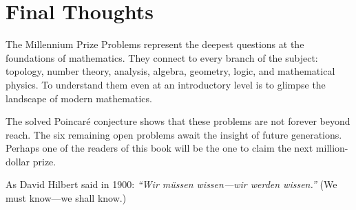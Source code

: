 \documentclass[11pt,a4paper]{book}
\theoremstyle{definition}
\begin{document}
\section*{Final Thoughts}

The Millennium Prize Problems represent the deepest questions at the foundations of mathematics. They connect to every branch of the subject: topology, number theory, analysis, algebra, geometry, logic, and mathematical physics. To understand them even at an introductory level is to glimpse the landscape of modern mathematics.

The solved Poincar\'{e} conjecture shows that these problems are not forever beyond reach. The six remaining open problems await the insight of future generations. Perhaps one of the readers of this book will be the one to claim the next million-dollar prize.

As David Hilbert said in 1900: \textit{``Wir m\"{u}ssen wissen---wir werden wissen.''} (We must know---we shall know.)
\end{document}
